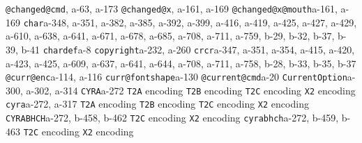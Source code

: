 \documentclass[twoside]{ltxdoc}
\makeatletter
\renewenvironment{theindex}{%
   \@restonecoltrue
   \if@twocolumn\@restonecolfalse\fi
   \columnseprule \z@
   \columnsep 35\p@
   \twocolumn[\index@prologue]%
   \IndexParms
   \let\item\@idxitem
   \ignorespaces
}{\if@restonecol\onecolumn\else\clearpage\fi}
\makeatother
\begin{document}
\begin{theindex}
  \item \texttt  {@changed@cmd}\pfill {}, a-63, 
                a-173
  \item \texttt  {@changed@x}\pfill {}, a-161, 
                a-169
  \item \texttt  {@changed@x@mouth}\pfill a-161, a-169
  \item \texttt  {char}\pfill a-348, a-351, a-382, a-385, 
                a-392, a-399, a-416, a-419, a-425, a-427, a-429, a-610, 
                a-638, a-641, a-671, a-678, a-685, a-708, a-711, a-759, 
                b-29, b-32, b-37, b-39, b-41
  \item \texttt  {chardef}\pfill a-8
  \item \texttt  {copyright}\pfill a-232, a-260
  \item \texttt  {crcr}\pfill a-347, a-351, a-354, a-415, 
                a-420, a-423, a-425, a-609, a-637, a-641, a-644, a-708, 
                a-711, a-758, b-28, b-33, b-35, b-37
  \item \texttt  {@curr@enc}\pfill a-114, a-116
  \item \texttt  {curr@fontshape}\pfill a-130
  \item \texttt  {@current@cmd}\pfill a-20
  \item \texttt  {CurrentOption}\pfill a-300, a-302, 
                a-314
  \item \texttt  {CYRA}\pfill a-272
    \subitem \texttt  {T2A} encoding\pfill {}
    \subitem \texttt  {T2B} encoding\pfill {}
    \subitem \texttt  {T2C} encoding\pfill {}
    \subitem \texttt  {X2} encoding\pfill {}
  \item \texttt  {cyra}\pfill a-272, a-317
    \subitem \texttt  {T2A} encoding\pfill {}
    \subitem \texttt  {T2B} encoding\pfill {}
    \subitem \texttt  {T2C} encoding\pfill {}
    \subitem \texttt  {X2} encoding\pfill {}
  \item \texttt  {CYRABHCH}\pfill a-272, b-458, b-462
    \subitem \texttt  {T2C} encoding\pfill {}
    \subitem \texttt  {X2} encoding\pfill {}
  \item \texttt  {cyrabhch}\pfill a-272, b-459, b-463
    \subitem \texttt  {T2C} encoding\pfill {}
    \subitem \texttt  {X2} encoding\pfill {}

\end{theindex}
\end{document}

